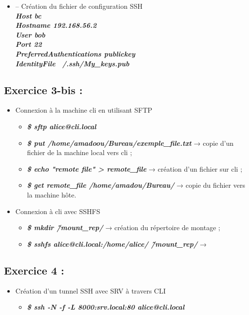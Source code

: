 \documentclass[a4paper]{article}
\begin{document}
	\begin{itemize}
		\item –	Création du fichier de configuration SSH \\
		\textbf{\textit{Host bc \\          
  					Hostname 192.168.56.2 \\
  					User bob \\
  					Port 22 \\
  					PreferredAuthentications publickey \\
  					IdentityFile ~/.ssh/My\_keys.pub \\ }}
 		
	\end{itemize}
	
	\subsection{Exercice 3-bis :}
	\begin{itemize}
		\item Connexion à la machine cli en utilisant SFTP
			\begin{itemize}
				\item \textbf{\textit{\$ sftp alice@cli.local}}
				\item \textbf{\textit{\$ put /home/amadoou/Bureau/exemple\_file.txt}} → copie d'un fichier de la machine local vers cli ;
				\item \textbf{\textit{\$ echo "remote file" > remote\_file}} → création d'un fichier sur cli ;
				\item \textbf{\textit{\$ get remote\_file /home/amadou/Bureau/}} → copie du fichier vers la machine hôte.
			\end{itemize}
		\item Connexion à cli avec SSHFS
			\begin{itemize}
				\item \textbf{\textit{\$ mkdir \~/mount\_rep/}} → création du répertoire de montage ;
				\item \textbf{\textit{\$ sshfs alice@cli.local:/home/alice/ \~/mount\_rep/}} → 
			\end{itemize}
	\end{itemize}
	
	\subsection{Exercice 4 :}
	\begin{itemize}
		\item Création d’un tunnel SSH avec SRV à travers CLI
			\begin{itemize}
				\item \textbf{\textit{\$ ssh -N -f -L 8000:srv.local:80 alice@cli.local}}
			\end{itemize}
	\end{itemize}
	
\end{document}
